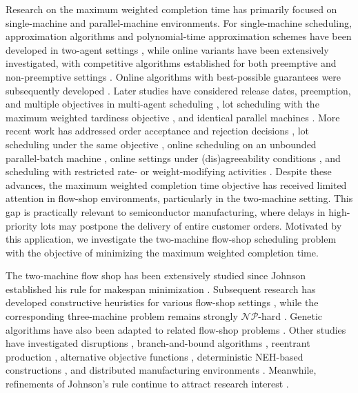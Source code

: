 ﻿\documentclass[12pt]{article}
\begin{document}
\begin{sloppypar}
Research on the maximum weighted completion time has primarily focused on single-machine
and parallel-machine environments. For single-machine scheduling, approximation algorithms
and polynomial-time approximation schemes have been developed in two-agent settings
\citep{NongChengNg2011EJOR}, while online variants have been extensively investigated, with
competitive algorithms established for both preemptive and non-preemptive settings
\citep{Li-Wenjie2015APJOR}. Online algorithms with best-possible guarantees were subsequently
developed \citep{chai2018best}. Later studies have considered release dates, preemption, and
multiple objectives in multi-agent scheduling \citep{yuan2020scheduling}, lot scheduling with
the maximum weighted tardiness objective \citep{mosheiov2023note}, and identical parallel
machines \citep{Sun2024JOCO}. More recent work has addressed order acceptance and rejection
decisions \citep{LuZuoZhangOu20254OR}, lot scheduling under the same objective
\citep{zheng2025lot}, online scheduling on an unbounded parallel-batch machine
\citep{zhang2025online}, online settings under (dis)agreeability conditions
\citep{fan2026online}, and scheduling with restricted rate- or weight-modifying activities
\citep{ZuoZhangShiFan2026DAM,zuo2026weight}. Despite these advances, the maximum weighted
completion time objective has received limited attention in flow-shop environments, particularly
in the two-machine setting. This gap is practically relevant to semiconductor manufacturing,
where delays in high-priority lots may postpone the delivery of entire customer orders.
Motivated by this application, we investigate the two-machine flow-shop scheduling problem
with the objective of minimizing the maximum weighted completion time.

The two-machine flow shop has been extensively studied since Johnson established his rule for
makespan minimization \citep{johnson1954optimal}. Subsequent research has developed
constructive heuristics for various flow-shop settings \citep{shao2021constructive}, while the
corresponding three-machine problem remains strongly $\mathcal{NP}$-hard
\citep{pinedo2022scheduling}. Genetic algorithms have also been adapted to related flow-shop
problems \citep{qiao2022adaptive,wang2023extended}. Other studies have investigated
disruptions \citep{hnaien2023random}, branch-and-bound algorithms \citep{liu2024branch},
reentrant production \citep{liu2024robust}, alternative objective functions
\citep{shabtay2024coordinating}, deterministic NEH-based constructions
\citep{puka2024deterministic}, and distributed manufacturing environments
\citep{becker2025distributed}. Meanwhile, refinements of Johnson's rule continue to attract
research interest \citep{dellacroce2026revisiting}.


\end{sloppypar}
\end{document}
